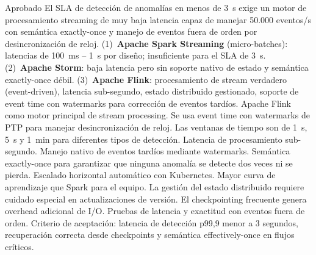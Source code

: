 \documentclass[12pt, letterpaper]{article}
\begin{document}
  {Aprobado}
  {El SLA de detección de anomalías en menos de 3~s exige un motor de procesamiento
   streaming de muy baja latencia capaz de manejar 50.000 eventos/s con semántica
   exactly-once y manejo de eventos fuera de orden por desincronización de reloj.}
  {(1)~\textbf{Apache Spark Streaming} (micro-batches): latencias de 100~ms -- 1~s por
   diseño; insuficiente para el SLA de 3~s.
   (2)~\textbf{Apache Storm}: baja latencia pero sin soporte nativo de estado y
   semántica exactly-once débil.
   (3)~\textbf{Apache Flink}: procesamiento de stream verdadero (event-driven),
   latencia sub-segundo, estado distribuido gestionado, soporte de event time con
   watermarks para corrección de eventos tardíos.}
  {Apache Flink como motor principal de stream processing. Se usa event time con
   watermarks de PTP para manejar desincronización de reloj. Las ventanas de tiempo
   son de 1~s, 5~s y 1~min para diferentes tipos de detección.}
  {Latencia de procesamiento sub-segundo. Manejo nativo de eventos tardíos mediante
   watermarks. Semántica exactly-once para garantizar que ninguna anomalía se detecte
   dos veces ni se pierda. Escalado horizontal automático con Kubernetes.}
  {Mayor curva de aprendizaje que Spark para el equipo. La gestión del estado
   distribuido requiere cuidado especial en actualizaciones de versión. El
    checkpointing frecuente genera overhead adicional de I/O.}
    {Pruebas de latencia y exactitud con eventos fuera de orden. Criterio de
    aceptación: latencia de detección p99,9 menor a 3 segundos, recuperación correcta
    desde checkpoints y semántica effectively-once en flujos críticos.}
\end{document}
